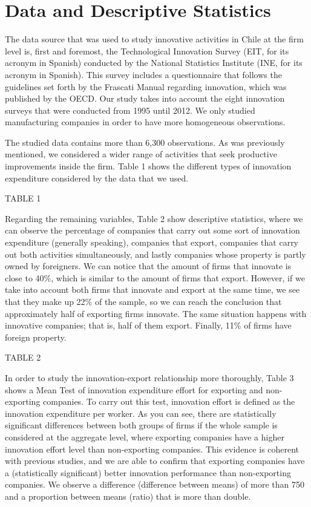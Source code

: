 \section{Data and Descriptive Statistics}
The data source that was used to study innovative activities in Chile at the firm level is, first and foremost, the Technological Innovation Survey (EIT, for its acronym in Spanish) conducted by the National Statistics Institute (INE, for its acronym in Spanish). This survey includes a questionnaire that follows the guidelines set forth by the Frascati Manual regarding innovation, which was published by the OECD. Our study takes into account the eight innovation surveys that were conducted from 1995 until 2012. We only studied manufacturing companies in order to have more homogeneous observations. 

The studied data contains more than 6,300 observations.  As was previously mentioned, we considered a wider range of activities that seek productive improvements inside the firm. Table 1 shows the different types of innovation expenditure considered by the data that we used.

TABLE 1


Regarding the remaining variables, Table 2 show descriptive statistics, where we can observe the percentage of companies that carry out some sort of innovation expenditure (generally speaking), companies that export, companies that carry out both activities simultaneously, and lastly companies whose property is partly owned by foreigners.
We can notice that the amount of firms that innovate  is close to 40\%, which is similar to the amount of firms that export. However, if we take into account both firms that innovate and export at the same time, we see that they make up 22\% of the sample, so we can reach the conclusion that approximately half of exporting firms innovate. The same situation happens with innovative companies; that is, half of them export. Finally, 11\% of firms have foreign property. 

TABLE 2

In order to study the innovation-export relationship more thoroughly, Table 3 shows a Mean Test of innovation expenditure effort for exporting and non-exporting companies. To carry out this test, innovation effort is defined as the innovation expenditure per worker.  As you can see, there are statistically significant differences between both groups of firms if the whole sample is considered at the aggregate level, where exporting companies have a higher innovation effort level than non-exporting companies. This evidence is coherent with previous studies, and we are able to confirm that exporting companies have a (statistically significant) better innovation performance than non-exporting companies. We observe a difference (difference between means) of more than 750 and a proportion between means  (ratio) that is more than double. 

